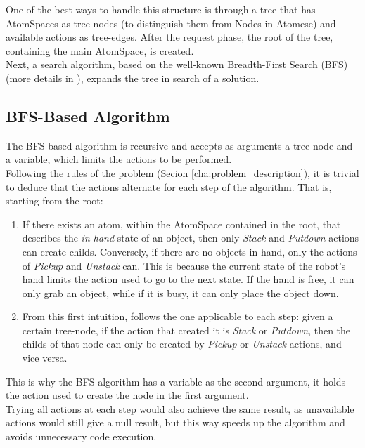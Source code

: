 One of the best ways to handle this structure is through a tree that has AtomSpaces as tree-nodes (to distinguish them from Nodes in Atomese) and available actions as tree-edges. 
After the request phase, the root of the tree, containing the main AtomSpace, is created. \\
Next, a search algorithm, based on the well-known Breadth-First Search (BFS) (more details in \cite{BFS-wiki, BFS}), expands the tree in search of a solution.

\subsection{BFS-Based Algorithm}\label{sec:bfs_search}

The BFS-based algorithm is recursive and accepts as arguments a tree-node and a variable, which limits the actions to be performed. \\
Following the rules of the problem (Secion \ref{cha:problem_description}), it is trivial to deduce that the actions alternate for each step of the algorithm.
That is, starting from the root:

\begin{enumerate} 
	\item If there exists an atom, within the AtomSpace contained in the root, that describes the \textit{in-hand} state of an object, then only \textit{Stack} and \textit{Putdown} actions can create childs. Conversely, if there are no objects in hand, only the actions of \textit{Pickup} and \textit{Unstack} can. This is because the current state of the robot's hand limits the action used to go to the next state. If the hand is free, it can only grab an object, while if it is busy, it can only place the object down.

	\item From this first intuition, follows the one applicable to each step: given a certain tree-node, if the action that created it is \textit{Stack} or \textit{Putdown}, then the childs of that node can only be created by \textit{Pickup} or \textit{Unstack} actions, and vice versa.
\end{enumerate}

This is why the BFS-algorithm has a variable as the second argument, it holds the action used to create the node in the first argument. \\
Trying all actions at each step would also achieve the same result, as unavailable actions would still give a null result, but this way speeds up the algorithm and avoids unnecessary code execution.


